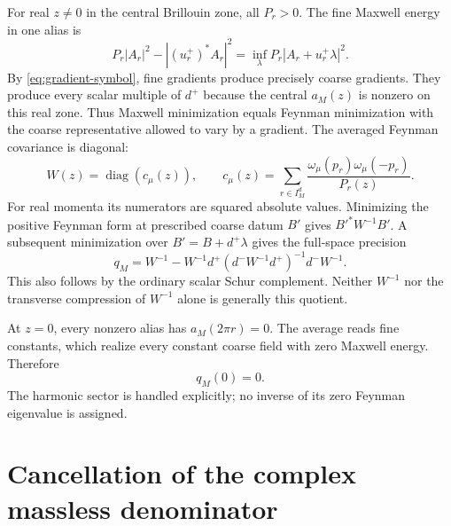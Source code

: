 \documentclass[11pt]{article}
\theoremstyle{remark}
\newcommand{\diag}{\operatorname{diag}}
\begin{document}
For real $z\ne0$ in the central Brillouin zone, all $P_r>0$.
The fine Maxwell energy in one alias is
\[
 P_r|A_r|^2-| (u_r^+)^*A_r|^2
 =\inf_\lambda P_r|A_r+u_r^+\lambda|^2.
\]
By \eqref{eq:gradient-symbol}, fine gradients produce precisely coarse
gradients. They produce every scalar multiple of $d^+$ because the
central $a_M(z)$ is nonzero on this real zone. Thus Maxwell minimization
equals Feynman minimization with the coarse representative allowed to
vary by a gradient. The averaged Feynman covariance is diagonal:
\begin{equation}\label{eq:feynman}
 W(z)=\diag(c_\mu(z)),\qquad
 c_\mu(z)=\sum_{r\in I_M^d}
       \frac{\omega_\mu(p_r)\omega_\mu(-p_r)}{P_r(z)}.
\end{equation}
For real momenta its numerators are squared absolute values.
Minimizing the positive Feynman form at prescribed coarse datum $B'$
gives $B'^*W^{-1}B'$. A subsequent minimization over
$B'=B+d^+\lambda$ gives the full-space precision
\begin{equation}\label{eq:quotient}
 q_M=W^{-1}-W^{-1}d^+
       (d^-W^{-1}d^+)^{-1}d^-W^{-1}.
\end{equation}
This also follows by the ordinary scalar Schur complement.
Neither $W^{-1}$ nor the transverse compression of $W^{-1}$ alone
is generally this quotient.

At $z=0$, every nonzero alias has $a_M(2\pi r)=0$.
The average reads fine constants, which realize every constant
coarse field with zero Maxwell energy. Therefore
\begin{equation}\label{eq:zero-mode}
 q_M(0)=0.
\end{equation}
The harmonic sector is handled explicitly; no inverse of its zero
Feynman eigenvalue is assigned.

\section{Cancellation of the complex massless denominator}
\end{document}
